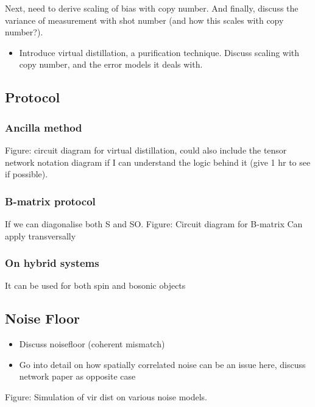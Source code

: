 Next, need to derive scaling of bias with copy number. And finally, discuss the variance of measurement with shot number (and how this scales with copy number?).

\begin{itemize}
    \item Introduce virtual distillation, a purification technique. Discuss scaling with copy number, and the error models it deals with.
\end{itemize}

\subsection{Protocol}
    \subsubsection{Ancilla method}
        Figure: circuit diagram for virtual distillation, could also include the tensor network notation diagram if I can understand the logic behind it (give 1 hr to see if possible).
    \subsubsection{B-matrix protocol}
        If we can diagonalise both S and SO.
        Figure: Circuit diagram for B-matrix
        Can apply transversally

    \subsubsection{On hybrid systems}
        It can be used for both spin and bosonic objects

\subsection{Noise Floor}
\begin{itemize}
    \item Discuss noisefloor (coherent mismatch)
    \item Go into detail on how spatially correlated noise can be an issue here, discuss network paper as opposite case
\end{itemize}
Figure: Simulation of vir dist on various noise models.

